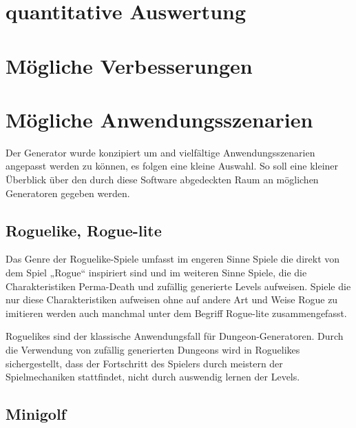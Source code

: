 \section{quantitative Auswertung}


\section{Mögliche Verbesserungen}\label{s.verbesserungen}


\section{Mögliche Anwendungsszenarien}\label{s.anwendungsmöglichkeiten}

Der Generator wurde konzipiert um and vielfältige Anwendungsszenarien angepasst werden zu können, es folgen eine kleine Auswahl. So soll eine kleiner Überblick über den durch diese Software abgedeckten Raum an möglichen Generatoren gegeben werden.

\subsection{Roguelike, Rogue-lite}

Das Genre der Roguelike-Spiele umfasst im engeren Sinne Spiele die direkt von dem Spiel „Rogue“ inspiriert sind und im weiteren Sinne Spiele, die die Charakteristiken Perma-Death und zufällig generierte Levels aufweisen. Spiele die nur diese Charakteristiken aufweisen ohne auf andere Art und Weise Rogue zu imitieren werden auch manchmal unter dem Begriff Rogue-lite zusammengefasst.

Roguelikes sind der klassische Anwendungsfall für Dungeon-Generatoren. Durch die Verwendung von zufällig generierten Dungeons wird in Roguelikes sichergestellt, dass der Fortschritt des Spielers durch meistern der Spielmechaniken stattfindet, nicht durch auswendig lernen der Levels. 


\subsection{Minigolf}

